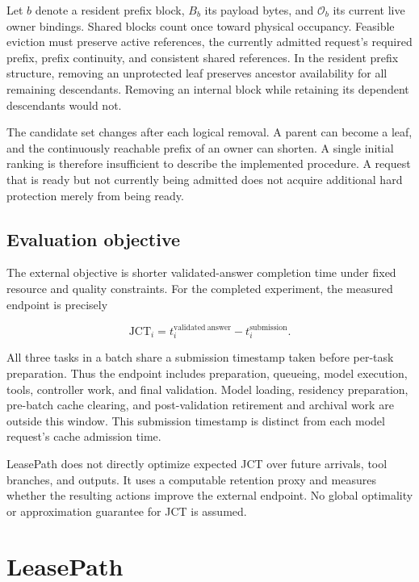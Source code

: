 \documentclass[sigconf, screen, review]{acmart}
\begin{document}
Let \(b\) denote a resident prefix block, \(B_b\) its payload bytes, and
\(\mathcal O_b\) its current live owner bindings. Shared blocks count
once toward physical occupancy. Feasible eviction must preserve active
references, the currently admitted request's required prefix, prefix
continuity, and consistent shared references. In the resident prefix
structure, removing an unprotected leaf preserves ancestor availability
for all remaining descendants. Removing an internal block while
retaining its dependent descendants would not.

The candidate set changes after each logical removal. A parent can
become a leaf, and the continuously reachable prefix of an owner can
shorten. A single initial ranking is therefore insufficient to describe
the implemented procedure. A request that is ready but not currently
being admitted does not acquire additional hard protection merely from
being ready.

\subsection{Evaluation objective}\label{evaluation-objective}

The external objective is shorter validated-answer completion time under
fixed resource and quality constraints. For the completed experiment,
the measured endpoint is precisely

\[
\mathrm{JCT}_i=t_i^{\mathrm{validated\ answer}}-t_i^{\mathrm{submission}}.
\]

All three tasks in a batch share a submission timestamp taken before
per-task preparation. Thus the endpoint includes preparation, queueing,
model execution, tools, controller work, and final validation. Model
loading, residency preparation, pre-batch cache clearing, and
post-validation retirement and archival work are outside this window.
This submission timestamp is distinct from each model request's cache
admission time.

LeasePath does not directly optimize expected JCT over future arrivals,
tool branches, and outputs. It uses a computable retention proxy and
measures whether the resulting actions improve the external endpoint. No
global optimality or approximation guarantee for JCT is assumed.

\section{LeasePath}\label{leasepath}
\end{document}
